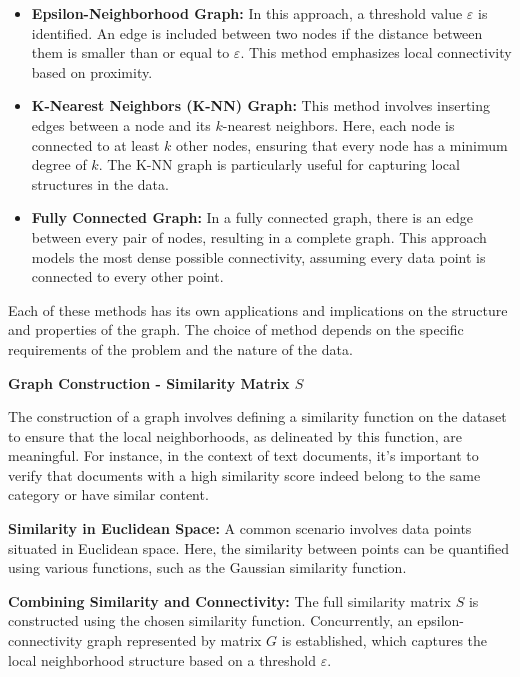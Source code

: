 \documentclass[unicode,11pt,a4paper,oneside,numbers=endperiod,openany]{scrartcl}
\begin{document}
\begin{itemize}
    \item \textbf{Epsilon-Neighborhood Graph:} In this approach, a threshold value \( \varepsilon \) is identified. An edge is included between two nodes if the distance between them is smaller than or equal to \( \varepsilon \). This method emphasizes local connectivity based on proximity.

    \item \textbf{K-Nearest Neighbors (K-NN) Graph:} This method involves inserting edges between a node and its \( k \)-nearest neighbors. Here, each node is connected to at least \( k \) other nodes, ensuring that every node has a minimum degree of \( k \). The K-NN graph is particularly useful for capturing local structures in the data.

    \item \textbf{Fully Connected Graph:} In a fully connected graph, there is an edge between every pair of nodes, resulting in a complete graph. This approach models the most dense possible connectivity, assuming every data point is connected to every other point.
\end{itemize}

Each of these methods has its own applications and implications on the structure and properties of the graph. The choice of method depends on the specific requirements of the problem and the nature of the data.

\textbf{Graph Construction - Similarity Matrix \( S \)}

The construction of a graph involves defining a similarity function on the dataset to ensure that the local neighborhoods, as delineated by this function, are meaningful. For instance, in the context of text documents, it's important to verify that documents with a high similarity score indeed belong to the same category or have similar content.

\textbf{Similarity in Euclidean Space:}
A common scenario involves data points situated in Euclidean space. Here, the similarity between points can be quantified using various functions, such as the Gaussian similarity function.

\textbf{Combining Similarity and Connectivity:}
The full similarity matrix \( S \) is constructed using the chosen similarity function. Concurrently, an epsilon-connectivity graph represented by matrix \( G \) is established, which captures the local neighborhood structure based on a threshold \( \varepsilon \).
\end{document}
